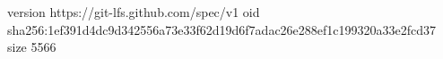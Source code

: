version https://git-lfs.github.com/spec/v1
oid sha256:1ef391d4dc9d342556a73e33f62d19d6f7adac26e288ef1c199320a33e2fcd37
size 5566
